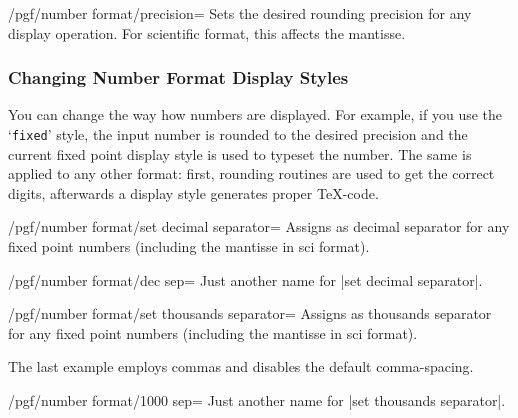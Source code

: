 \begin{key}{/pgf/number format/precision=}
Sets the desired rounding precision for any display operation. For scientific format, this affects the mantisse.
\end{key}

\subsubsection{Changing Number Format Display Styles}%
\label{sec:number:styles}%
You can change the way how numbers are displayed. For example, if you use the `\texttt{fixed}' style, the input number is rounded to the desired precision and the current fixed point display style is used to typeset the number. The same is applied to any other format: first, rounding routines are used to get the correct digits, afterwards a display style generates proper \TeX-code.

\begin{key}{/pgf/number format/set decimal separator=}
Assigns  as decimal separator for any fixed point numbers (including the mantisse in sci format).
\end{key}
\begin{key}{/pgf/number format/dec sep=}
	Just another name for |set decimal separator|.
\end{key}


\begin{key}{/pgf/number format/set thousands separator=}
Assigns  as thousands separator for any fixed point numbers (including the mantisse in sci format).

\begin{codeexample}[]
\end{codeexample}
\begin{codeexample}[]
\end{codeexample}

\begin{codeexample}[]
\end{codeexample}
\begin{codeexample}[]
\end{codeexample}
\begin{codeexample}[]
\end{codeexample}
The last example employs commas and disables the default comma-spacing. 
\end{key}
\begin{key}{/pgf/number format/1000 sep=}
	Just another name for |set thousands separator|.
\end{key}

